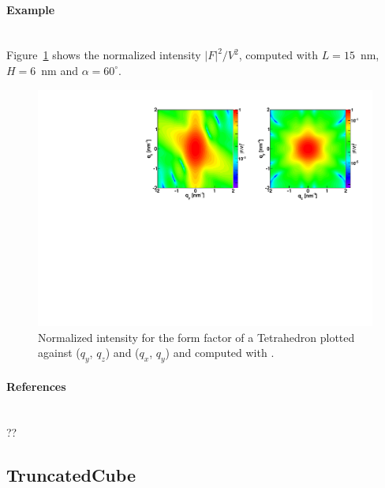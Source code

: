 \paragraph{Example}\strut\\
Figure~\ref{fig:FFtetrahEx} shows the normalized intensity
$|F|^2/V^2$, computed with $L=15$~nm, $H=6$~nm and $\alpha =60
^{\circ}$.

\begin{figure}[h]
\begin{center}
\includegraphics[angle=-90,width=\textwidth]{fig/ff/figfftetrahedron.pdf}
\end{center}
\caption{Normalized intensity for the form factor of a Tetrahedron
  plotted against ($q_y$, $q_z$) and  ($q_x$, $q_y$) and
  computed with .}
\label{fig:FFtetrahEx}
\end{figure}

\paragraph{References}\strut\\
??

\clearpage
\subsection{TruncatedCube} \label{sec:TruncatedCube}  

